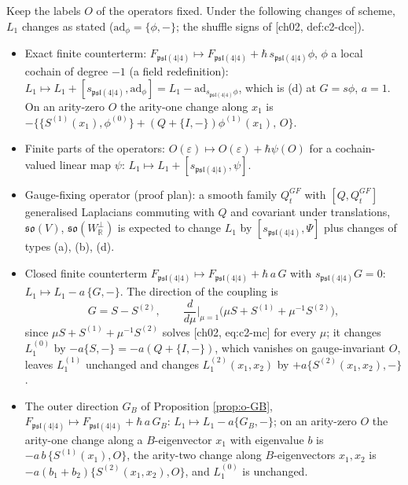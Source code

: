 \begin{proposition}
\label{prop:o-laws}
Keep the labels $O$ of the operators fixed. Under the following changes of scheme, $L_1$ changes as stated ($\mathrm{ad}_\phi=\{\phi,-\}$; the shuffle signs of [ch02, def:c2-dce]).
\begin{itemize}
\item[(a)] Exact finite counterterm: $F_{\mathfrak{psl}(4|4)}\mapsto F_{\mathfrak{psl}(4|4)}+\hbar\,s_{\mathfrak{psl}(4|4)}\phi$, $\phi$ a local cochain of degree $-1$ (a field redefinition): $L_1\mapsto L_1+[s_{\mathfrak{psl}(4|4)},\mathrm{ad}_\phi]=L_1-\mathrm{ad}_{s_{\mathfrak{psl}(4|4)}\phi}$, which is (d) at $G=s\phi$, $a=1$. On an arity-zero $O$ the arity-one change along $x_1$ is $-\big\{\{S^{(1)}(x_1),\phi^{(0)}\}+(Q+\{I,-\})\phi^{(1)}(x_1),\,O\big\}$.
\item[(b)] Finite parts of the operators: $O(\varepsilon)\mapsto O(\varepsilon)+\hbar\psi(O)$ for a cochain-valued linear map $\psi$: $L_1\mapsto L_1+[s_{\mathfrak{psl}(4|4)},\psi]$.
\item[(c)] Gauge-fixing operator (proof plan): a smooth family $Q^{GF}_t$ with $[Q,Q^{GF}_t]$ generalised Laplacians commuting with $Q$ and covariant under translations, $\mathfrak{so}(V)$, $\mathfrak{so}(W_{\mathbb R}^\perp)$ is expected to change $L_1$ by $[s_{\mathfrak{psl}(4|4)},\Psi]$ plus changes of types (a), (b), (d).
\item[(d)] Closed finite counterterm $F_{\mathfrak{psl}(4|4)}\mapsto F_{\mathfrak{psl}(4|4)}+\hbar\,a\,G$ with $s_{\mathfrak{psl}(4|4)}G=0$: $L_1\mapsto L_1-a\,\{G,-\}$. The direction of the coupling is
\begin{equation}
G=S-S^{(2)},\qquad \frac{d}{d\mu}\Big|_{\mu=1}\big(\mu S+S^{(1)}+\mu^{-1}S^{(2)}\big),
\label{eq:o-coupling}
\end{equation}
since $\mu S+S^{(1)}+\mu^{-1}S^{(2)}$ solves [ch02, eq:c2-mc] for every $\mu$; it changes $L_1^{(0)}$ by $-a\{S,-\}=-a(Q+\{I,-\})$, which vanishes on gauge-invariant $O$, leaves $L_1^{(1)}$ unchanged and changes $L_1^{(2)}(x_1,x_2)$ by $+a\{S^{(2)}(x_1,x_2),-\}$.
\item[(e)] The outer direction $G_B$ of Proposition \ref{prop:o-GB}, $F_{\mathfrak{psl}(4|4)}\mapsto F_{\mathfrak{psl}(4|4)}+\hbar\,a\,G_B$: $L_1\mapsto L_1-a\{G_B,-\}$; on an arity-zero $O$ the arity-one change along a $B$-eigenvector $x_1$ with eigenvalue $b$ is $-a\,b\,\{S^{(1)}(x_1),O\}$, the arity-two change along $B$-eigenvectors $x_1,x_2$ is $-a(b_1+b_2)\{S^{(2)}(x_1,x_2),O\}$, and $L_1^{(0)}$ is unchanged.

\end{itemize}
\end{proposition}
